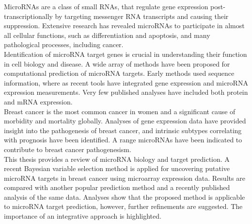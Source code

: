 \documentclass[english,12pt,a4paper,pdftex,elec,utf8]{aaltothesis}
\begin{document}
\begin{abstractpage}[english]

MicroRNAs are a class of small RNAs, that regulate gene expression
post-transcriptionally by targeting messenger RNA transcripts and causing their
suppression. Extensive research has revealed microRNAs to participate in
almost all cellular functions, such as differentiation and apoptosis, and
many pathological processes, including cancer. \\

Identification of microRNA target genes is crucial in understanding their
function in cell biology and disease. A wide array of methods have been
proposed for computational prediction of microRNA targets. Early methods used
sequence information, where as recent tools have integrated gene expression
and microRNA expression measurements. Very few published analyses have
included both protein and mRNA expression. \\

Breast cancer is the most common cancer in women and a significant cause of
morbidity and mortality globally. Analyses of gene expression data have
provided insight into the pathogenesis of breast cancer, and intrinsic subtypes
correlating with prognosis have been identified. A range microRNAs have been
indicated to contribute to breast cancer pathogenesism. \\

This thesis provides a review of microRNA biology and target prediction. A
recent Bayesian variable selection method is applied for uncovering putative
microRNA targets in breast cancer using microarray expression data. Results
are compared with another popular prediction method and a recently published
analysis of the same data. Analyses show that the proposed method is
applicable to microRNA target prediction, however, further refinements are
suggested. The importance of an integrative approach is highlighted.

\end{abstractpage}

\newpage
\end{document}
